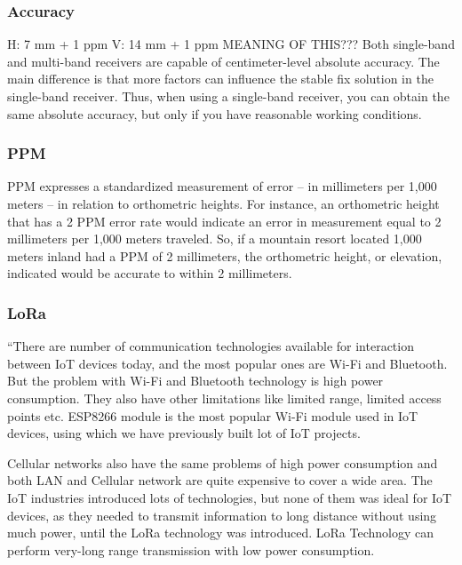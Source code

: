 \subsubsection{Accuracy}\label{sec:II_gnssAug_rtk_accuracy}
H: 7 mm + 1 ppm
V: 14 mm + 1 ppm	MEANING OF THIS???
Both single-band and multi-band receivers are capable of centimeter-level absolute accuracy. The main difference is that more factors can influence the stable fix solution in the single-band receiver. Thus, when using a single-band receiver, you can obtain the same absolute accuracy, but only if you have reasonable working conditions.

\subsubsection{PPM}\label{sec:II_gnssAug_rtk_ppm}
PPM expresses a standardized measurement of error -- in millimeters per 1,000 meters -- in relation to orthometric heights. For instance, an orthometric height that has a 2 PPM error rate would indicate an error in measurement equal to 2 millimeters per 1,000 meters traveled. So, if a mountain resort located 1,000 meters inland had a PPM of 2 millimeters, the orthometric height, or elevation, indicated would be accurate to within 2 millimeters.

\subsubsection{LoRa}\label{sec:II_gnssAug_rtk_LoRa}
``There are number of communication technologies available for interaction between IoT devices today, and the most popular ones are Wi-Fi and Bluetooth. But the problem with Wi-Fi and Bluetooth technology is high power consumption. They also have other limitations like limited range, limited access points etc. ESP8266 module is the most popular Wi-Fi module used in IoT devices, using which we have previously built lot of IoT projects.

Cellular networks also have the same problems of high power consumption and both LAN and Cellular network are quite expensive to cover a wide area. The IoT industries introduced lots of technologies, but none of them was ideal for IoT devices, as they needed to transmit information to long distance without using much power, until the LoRa technology was introduced. LoRa Technology can perform very-long range transmission with low power consumption.

